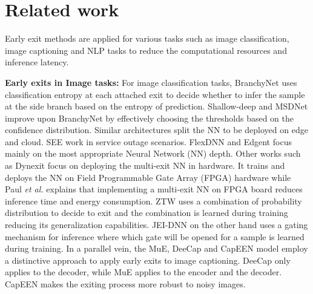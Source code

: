 \section{Related work}
Early exit methods are applied for various tasks such as image classification, image captioning and NLP tasks to reduce the computational resources and inference latency. 

\noindent\textbf{Early exits in Image tasks:}
For image classification tasks, BranchyNet \citep{teerapittayanon2016branchynet} uses classification entropy at each attached exit to decide whether to infer the sample at the side branch based on the entropy of prediction.
Shallow-deep \citep{kaya2019shallow} and MSDNet \citep{huang2017multi} improve upon BranchyNet by effectively choosing the thresholds based on the confidence distribution.
Similar architectures \citep{pacheco2021calibration, dai2020epnet} split the NN to be deployed on edge and cloud. SEE \citep{wang2019see} work in service outage scenarios. FlexDNN \citep{fang2020flexdnn} and Edgent \citep{li2019edge} focus mainly on the most appropriate Neural Network (NN) depth. Other works such as Dynexit \citep{wang2019dynexit} focus on deploying the multi-exit NN in hardware. It trains and deploys the NN on Field Programmable Gate Array (FPGA) hardware while Paul \textit{et al.} \citep{kim2020low} explains that implementing a multi-exit NN on FPGA board reduces inference time and energy consumption. ZTW \citep{sun2021early} uses a combination of probability distribution to decide to exit and the combination is learned during training reducing its generalization capabilities. JEI-DNN \citep{regol2023jointly} on the other hand uses a gating mechanism for inference where which gate will be opened for a sample is learned during training.
In a parallel vein, the MuE, DeeCap and CapEEN \citep{tang2023you, fei2022deecap, bajpai2024capeen} model employ a distinctive approach to apply early exits to image captioning. DeeCap only applies to the decoder, while  MuE applies to the encoder and the decoder. CapEEN makes the exiting process more robust to noisy images.

